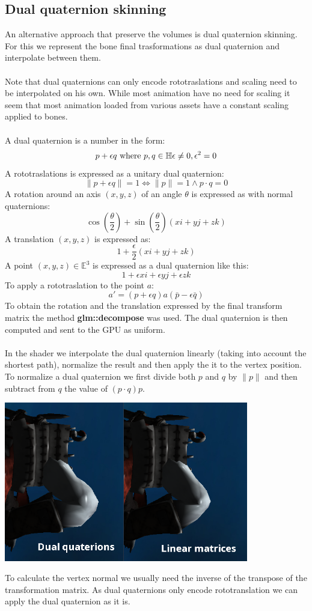 \documentclass[12pt, a4paper]{article}
\begin{document}
\subsection{Dual quaternion skinning}
An alternative approach that preserve the volumes is dual quaternion skinning. For this we represent the bone final trasformations as dual quaternion
and interpolate between them.\\\\
Note that dual quaternions can only encode rototraslations and scaling need to be interpolated on his own. While most animation have no need for scaling
it seem that most animation loaded from various assets have a constant scaling applied to bones.\\\\
A dual quaternion is a number in the form:
\[
    p + \epsilon q \text{ where } p, q \in \mathbb{H}\\\\
    \epsilon \neq 0, \epsilon^2 = 0
\]
A rototraslations is expressed as a unitary dual quaternion:
\[
    \|p + \epsilon q\| = 1 \iff \|p\| = 1 \land p \cdot q = 0
\]
A rotation around an axis $(x, y, z)$ of an angle $\theta$ is expressed as with normal quaternions:
\[
    \cos(\frac{\theta}{2})+\sin(\frac{\theta}{2})(xi + yj + zk)
\]
A translation $(x, y, z)$ is expressed as:
\[
    1+\frac{\epsilon}{2}(xi + yj + zk)
\]
A point $(x, y, z) \in \mathbb{E}^3$ is expressed as a dual quaternion like this:
\[
    1 + \epsilon xi + \epsilon yj + \epsilon zk
\]
To apply a rototraslation to the point $a$:
\[
    a' = (p + \epsilon q)a(\bar{p} - \epsilon \bar{q})
\]
To obtain the rotation and the translation expressed by the final transform matrix the method \textbf{glm::decompose} was used.
The dual quaternion is then computed and sent to the GPU as uniform.\\\\
In the shader we interpolate the dual quaternion linearly (taking into account the shortest path), normalize the result and then apply the it to the vertex position.
To normalize a dual quaternion we first divide both $p$ and $q$ by $\|p\|$ and then subtract from $q$ the value of $(p \cdot q)p$.
\begin{center}
    \centering
    \includegraphics[width=0.8\textwidth]{img/dq.png}
\end{center}
To calculate the vertex normal we usually need the inverse of the transpose of the transformation matrix. As dual quaternions only encode rototranslation
we can apply the dual quaternion as it is.
\end{document}

